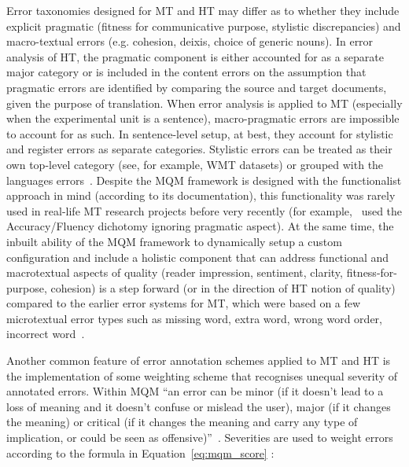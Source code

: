 Error taxonomies designed for MT and HT may differ as to whether they include explicit pragmatic (fitness for communicative purpose, stylistic discrepancies) and macro-textual errors (e.g. cohesion, deixis, choice of generic nouns). In error analysis of HT, the pragmatic component is either accounted for as a separate major category or is included in the content errors on the assumption that pragmatic errors are identified by comparing the source and target documents, given the purpose of translation. 
When error analysis is applied to MT (especially when the experimental unit is a sentence), macro-pragmatic errors are impossible to account for as such. In sentence-level setup, at best, they account for stylistic and register errors as separate categories. Stylistic errors can be treated as their own top-level category (see, for example, WMT datasets) or grouped with the languages errors~\cite[see]{Zaretskaya2016}. 
Despite the MQM framework is designed with the functionalist approach in mind (according to its documentation), %
this functionality was rarely used in real-life MT research projects before very recently (for example,~\citet{SanchezTorron2016} used the Accuracy/Fluency dichotomy ignoring pragmatic aspect). 
At the same time, the inbuilt ability of the MQM framework to dynamically setup a custom configuration and include a holistic component that can address functional and macrotextual aspects of quality (reader impression, sentiment, clarity, fitness-for-purpose, cohesion) is a step forward (or in the direction of HT notion of quality) compared to the earlier error systems for MT, which were based on a few microtextual error types such as missing word, extra word, wrong word order, incorrect word~\cite{Llitjos2005, Vilar2006}. 

Another common feature of error annotation schemes applied to MT and HT is the implementation of some weighting scheme that recognises unequal severity of annotated errors. Within MQM ``an error can be minor (if it doesn't lead to a loss of meaning and it doesn't confuse or mislead the user), major (if it changes the meaning) or critical (if it changes the meaning and carry any type of implication, or could be seen as offensive)''~\cite{Dugast2016}. Severities are used to weight errors according to the formula in Equation~\ref{eq:mqm_score} \cite[from][p.745, who refered to \citet{SanchezTorron2016}]{Specia2020wmt}:

